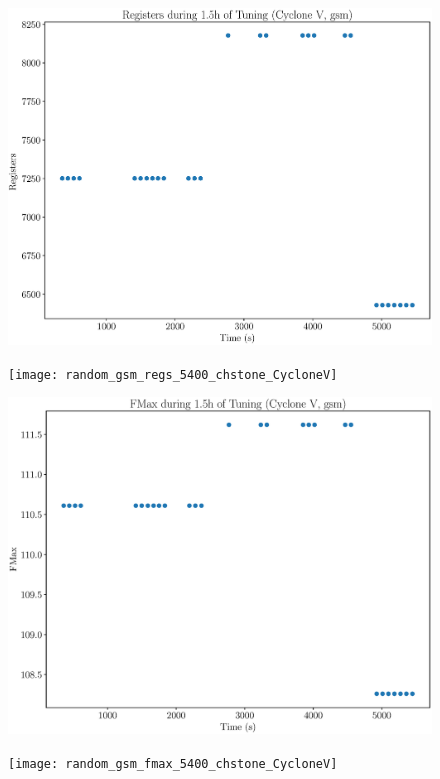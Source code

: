 \documentclass[12pt, a4paper]{article}
\begin{document}
\begin{figure}[htpb]
    \begin{minipage}{.48\textwidth}
        \includegraphics[scale=.25]{gsm_regs_5400_chstone_CycloneV}
    \end{minipage}%
    \hfill
    \begin{minipage}{.48\textwidth}
        \texttt{[image: random\_gsm\_regs\_5400\_chstone\_CycloneV]}
    \end{minipage}%

    \begin{minipage}{.48\textwidth}
        \includegraphics[scale=.25]{gsm_fmax_5400_chstone_CycloneV}
    \end{minipage}%
    \hfill
    \begin{minipage}{.48\textwidth}
        \texttt{[image: random\_gsm\_fmax\_5400\_chstone\_CycloneV]}
    \end{minipage}%
\end{figure}
\end{document}
